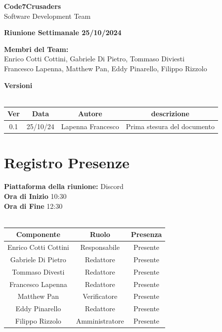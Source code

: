 \documentclass{article}
\begin{document}
\begin{titlepage}
    {\Huge \textbf{Code7Crusaders}}\\
    \vspace{0.5cm}
    {\Large Software Development Team}\\
    \vspace{2cm}
    
    {\large \textbf{Riunione Settimanale 25/10/2024}}\\
    \vspace{5cm}

    \textbf{Membri del Team:}\\
    Enrico Cotti Cottini, Gabriele Di Pietro, Tommaso Diviesti \\
    Francesco Lapenna, Matthew Pan, Eddy Pinarello, Filippo Rizzolo \\
    \vspace{0.5cm}
    
    \vspace{1cm}
\end{titlepage}

\begin{center}
    \textbf{Versioni}
    \\
    \\
    \begin{tabular}{|c|c|c|c|}
        \hline
        \textbf{Ver} & \textbf{Data} & \textbf{Autore} & \textbf{descrizione}\\
        \hline
        0.1 & 25/10/24 & Lapenna Francesco & Prima stesura del documento \\ 
        \hline
    \end{tabular}
\end{center}

\newpage
\tableofcontents

\newpage
\section{Registro Presenze}
\textbf{Piattaforma della riunione:} Discord \\
\textbf{Ora di Inizio} 10:30\\
\textbf{Ora di Fine} 12:30\\
\\
\begin{tabular}{|c|c|c|}
    \hline
    \textbf{Componente} & \textbf{Ruolo} & \textbf{Presenza}\\
    \hline
    Enrico Cotti Cottini & Responsabile& Presente \\ 
    \hline
    Gabriele Di Pietro & Redattore & Presente\\ 
    \hline
    Tommaso Divesti & Redattore & Presente \\ 
    \hline 
    Francesco Lapenna & Redattore& Presente \\ 
    \hline
    Matthew Pan & Verificatore & Presente\\ 
    \hline 
    Eddy Pinarello & Redattore & Presente \\ 
    \hline 
    Filippo Rizzolo & Amministratore& Presente \\ 
    \hline 
\end{tabular}
\end{document}
